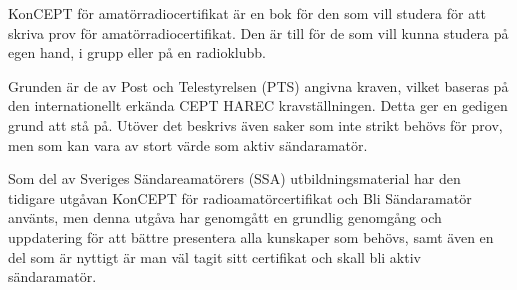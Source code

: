 \newpage
\AddToShipoutPicture*{\BackgroundPicLast}

\color{white}
KonCEPT för amatörradiocertifikat är en bok för den som vill studera för att
skriva prov för amatörradiocertifikat. Den är till för de som vill kunna studera
på egen hand, i grupp eller på en radioklubb.

Grunden är de av Post och Telestyrelsen (PTS) angivna kraven, vilket baseras på
den internationellt erkända CEPT HAREC kravställningen. Detta ger en gedigen
grund att stå på. Utöver det beskrivs även saker som inte strikt behövs för
prov, men som kan vara av stort värde som aktiv sändaramatör.

Som del av Sveriges Sändareamatörers (SSA) utbildningsmaterial har den tidigare
utgåvan KonCEPT för radioamatörcertifikat och Bli Sändaramatör använts, men
denna utgåva har genomgått en grundlig genomgång och uppdatering för att
bättre presentera alla kunskaper som behövs, samt även en del som är nyttigt
är man väl tagit sitt certifikat och skall bli aktiv sändaramatör.
